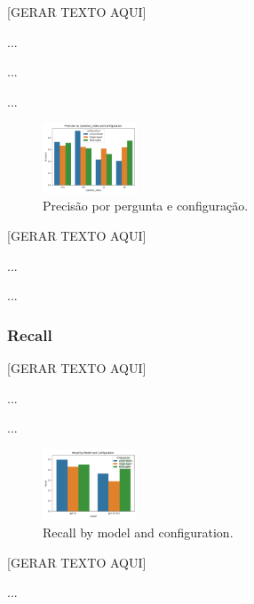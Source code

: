                 [GERAR TEXTO AQUI]

                ...

                ...

                ...

                \begin{figure}[h!]
                    \centering              
                    \includegraphics[width=0.25\textwidth]{images_part_2/question_precision_question_index_configuration.png}
                    \caption{Precisão por pergunta e configuração.}
                    \label{fig:question_precision_question_index_configuration}
                \end{figure}    

                [GERAR TEXTO AQUI]

                ...

                ...

            
            \subsubsection{Recall}
            
                [GERAR TEXTO AQUI]

                ...

                ...
                
                \begin{figure}[h!]
                    \centering              
                    \includegraphics[width=0.25\textwidth]{images_part_2/model_recall_model_configuration.png}
                    \caption{Recall by model and configuration.}
                    \label{fig:model_recall_model_configuration}
                \end{figure}

                [GERAR TEXTO AQUI]

                ...

